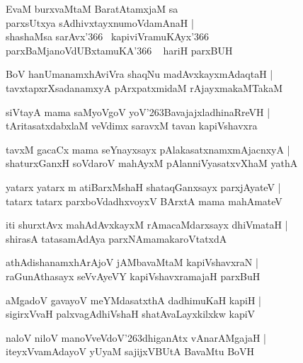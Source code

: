 \documentclass[twoside,12pt,openright]{book}
\def\S{\char'263}
\newcounter{shloka}[chapter]
\begin{document}
\begin{shloka}%
EvaM burxvaMtaM BaratAtamxjaM sa \\
parxsUtxya sAdhivxtayxnumoVdamAnaH |\\
shashaMsa sarAvx\char'366 ~kapiviVramuKAyx\char'366 ~\\
parxBaMjanoVdUBxtamuKA\char'366 ~ hariH parxBUH
\end{shloka}

\begin{shloka}%
BoV hanUmanamxhAviVra shaqNu madAvxkayxmAdaqtaH |\\
tavxtapxrXsadanamxyA pArxpatxmidaM rAjayxmakaMTakaM 
\end{shloka}

\begin{shloka}%
siVtayA mama saMyoVgoV yoV\S BavajajxladhinaRreVH |\\
tAritasatxdabxlaM veVdimx saravxM tavan kapiVshavxra
\end{shloka}

\begin{shloka}%
tavxM gacaCx mama seYnayxsayx pAlakasatxnamxmAjacnxyA |\\
shaturxGanxH soVdaroV mahAyxM pAlanniVyasatxvXhaM yathA 
\end{shloka}

\begin{shloka}%
yatarx yatarx m atiBarxMshaH shataqGanxsayx parxjAyateV |\\
tatarx tatarx parxboVdadhxvoyxV BArxtA mama mahAmateV 
\end{shloka}

\begin{shloka}%
iti shurxtAvx mahAdAvxkayxM rAmacaMdarxsayx dhiVmataH |\\
shirasA tatasamAdAya parxNAmamakaroVtatxdA 
\end{shloka}

\begin{shloka}%
athAdishanamxhArAjoV jAMbavaMtaM kapiVshavxraN |\\
raGunAthasayx seVvAyeVY kapiVshavxramajaH parxBuH
\end{shloka}

\begin{shloka}%
aMgadoV gavayoV meYMdasatxthA dadhimuKaH kapiH |\\
sigirxVvaH palxvagAdhiVshaH shatAvaLayxkilxkw kapiV 
\end{shloka}

\begin{shloka}%
naloV niloV manoVveVdoV\S dhiganAtx vAnarAMgajaH |\\
iteyxVvamAdayoV yUyaM sajijxVBUtA BavaMtu BoVH
\end{shloka}
\end{document}
